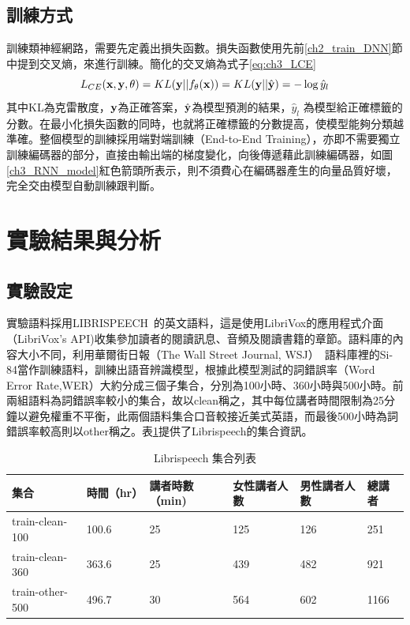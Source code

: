 \subsection{訓練方式}
訓練類神經網路，需要先定義出損失函數。損失函數使用先前\ref{ch2_train_DNN}節中提到交叉熵，來進行訓練。簡化的交叉熵為式子\ref{eq:ch3_LCE}
\begin{equation} 
\label{eq:ch3_LCE}
L_{CE}(\bold{x} , \bold{y} , \theta) = KL(\bold{y} || f_{\theta}(\bold{x})) =KL( \bold{y} ||\hat{\bold {y}} )  = - \log \hat{y}_{l} 
\end{equation}
其中KL為克雷散度，$\bold{y}$為正確答案，$\hat{\bold{y}}$為模型預測的結果，$ \hat{y}_{l} $ 為模型給正確標籤的分數。在最小化損失函數的同時，也就將正確標籤的分數提高，使模型能夠分類越準確。整個模型的訓練採用端對端訓練（End-to-End
Training），亦即不需要獨立訓練編碼器的部分，直接由輸出端的梯度變化，向後傳遞藉此訓練編碼器，如圖\ref{ch3_RNN_model}紅色箭頭所表示，則不須費心在編碼器產生的向量品質好壞，完全交由模型自動訓練跟判斷。
\section{實驗結果與分析}
\subsection{實驗設定}
 實驗語料採用LIBRISPEECH~\cite{panayotov2015librispeech}的英文語料，這是使用LibriVox的應用程式介面（LibriVox's
 API)收集參加讀者的閱讀訊息、音頻及閱讀書籍的章節。語料庫的內容大小不同，利用華爾街日報（The
 Wall Street Journal,
 WSJ）~\cite{paul1992design}語料庫裡的Si-84當作訓練語料，訓練出語音辨識模型，根據此模型測試的詞錯誤率（Word
 Error
 Rate,WER）大約分成三個子集合，分別為100小時、360小時與500小時。前兩組語料為詞錯誤率較小的集合，故以clean稱之，其中每位講者時間限制為25分鐘以避免權重不平衡，此兩個語料集合口音較接近美式英語，而最後500小時為詞錯誤率較高則以other稱之。表\ref{table:ex_info}提供了Librispeech的集合資訊。
 \begin{table}[ht]
	 \caption{Librispeech 集合列表}
	 \label{table:ex_info}
 \begin{tabular}[t]{|l|l|l|l|l|l|}
	 \hline
	 集合 & 時間（hr） & 講者時數（min) &女性講者人數&男性講者人數&總講者\\
	 \hline
	 train-clean-100   & 100.6   & 25 & 125 & 126 & 251 \\
	 \hline
	 train-clean-360   & 363.6   & 25 & 439 & 482 & 921 \\
	 \hline
	 train-other-500   & 496.7   & 30 & 564 & 602 & 1166 \\
	 \hline
 \end{tabular}
 \end{table}
 
